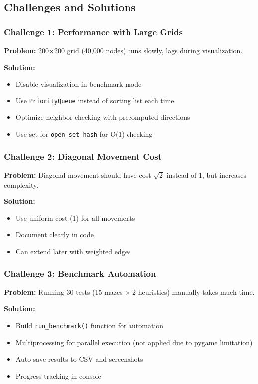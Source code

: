 \documentclass[12pt,a4paper]{article}
\begin{document}
\subsection{Challenges and Solutions}

\subsubsection{Challenge 1: Performance with Large Grids}
\textbf{Problem:} 200×200 grid (40,000 nodes) runs slowly, lags during visualization.

\textbf{Solution:}
\begin{itemize}
    \item Disable visualization in benchmark mode
    \item Use \texttt{PriorityQueue} instead of sorting list each time
    \item Optimize neighbor checking with precomputed directions
    \item Use set for \texttt{open\_set\_hash} for O(1) checking
\end{itemize}

\subsubsection{Challenge 2: Diagonal Movement Cost}
\textbf{Problem:} Diagonal movement should have cost $\sqrt{2}$ instead of 1, but increases complexity.

\textbf{Solution:}
\begin{itemize}
    \item Use uniform cost (1) for all movements
    \item Document clearly in code
    \item Can extend later with weighted edges
\end{itemize}

\subsubsection{Challenge 3: Benchmark Automation}
\textbf{Problem:} Running 30 tests (15 mazes × 2 heuristics) manually takes much time.

\textbf{Solution:}
\begin{itemize}
    \item Build \texttt{run\_benchmark()} function for automation
    \item Multiprocessing for parallel execution (not applied due to pygame limitation)
    \item Auto-save results to CSV and screenshots
    \item Progress tracking in console
\end{itemize}
\end{document}
